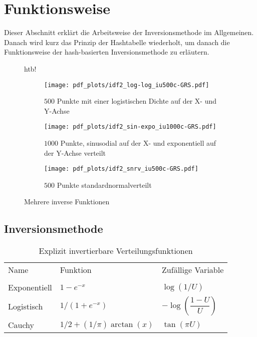 \section{Funktionsweise}
\label{funktion}

Dieser Abschnitt erklärt die Arbeitsweise der Inversionsmethode im Allgemeinen. Danach wird kurz das Prinzip 
der Hashtabelle wiederholt, um danach die Funktionsweise der hash-basierten Inversionsmethode zu erläutern.


\begin{figure*}{htb!}
    \centering
    \begin{subfigure}[b]{.3\textwidth}
        \centering
        \texttt{[image: pdf\_plots/idf2\_log-log\_iu500c-GRS.pdf]}
        \caption{$500$ Punkte mit einer logistischen Dichte auf der X- und Y-Achse}
        \label{fig:loglog_examplePlot}
    \end{subfigure}
    \hfill
    \begin{subfigure}[b]{.3\textwidth}
        \centering
        \texttt{[image: pdf\_plots/idf2\_sin-expo\_iu1000c-GRS.pdf]}
        \caption{$1000$ Punkte, sinusodial auf der X- und exponentiell auf der Y-Achse verteilt}
        \label{fig:sinexpo_examplePlot}
    \end{subfigure}
    \hfill
    \begin{subfigure}[b]{.3\textwidth}
        \centering
        \texttt{[image: pdf\_plots/idf2\_snrv\_iu500c-GRS.pdf]}
        \caption{$500$ Punkte standardnormalverteilt}
        \label{fig:snrv_examplePlot}
    \end{subfigure}
    \caption{Mehrere inverse Funktionen}
    \label{fig:examplePlot}
\end{figure*}


\subsection{Inversionsmethode}
\begin{table}[htb!]
    \centering
    \begin{tabular}{lll}
    Name         & Funktion & Zufällige Variable \\
                 &          &                    \\
    Exponentiell & $1 - e^{-x}$ & $\log(1/U)$ \\
    Logistisch   & $1 / (1 + e^{-x})$ & $-\log(\dfrac{1-U}{U})$ \\
    Cauchy       & $1/2 + (1/\pi) \arctan(x)$ & $\tan(\pi U)$
    \end{tabular}
    \caption{Explizit invertierbare Verteilungsfunktionen \cite{devroye-non_uniform_random_variate-1986}}
    \label{fig:invFuncs}
\end{table}


